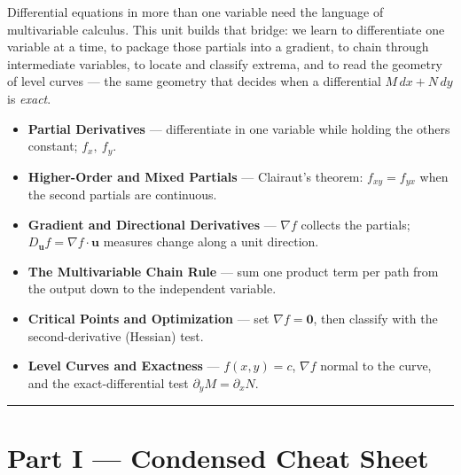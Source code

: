 \begin{topicsbox}
Differential equations in more than one variable need the language of
multivariable calculus. This unit builds that bridge: we learn to differentiate
one variable at a time, to package those partials into a gradient, to chain
through intermediate variables, to locate and classify extrema, and to read the
geometry of level curves --- the same geometry that decides when a differential
$M\,dx+N\,dy$ is \emph{exact}.
\begin{itemize}[leftmargin=1.4em, itemsep=3pt]
    \item \textbf{Partial Derivatives} --- differentiate in one variable while
          holding the others constant; $f_x,\ f_y$.
    \item \textbf{Higher-Order and Mixed Partials} --- Clairaut's theorem:
          $f_{xy}=f_{yx}$ when the second partials are continuous.
    \item \textbf{Gradient and Directional Derivatives} --- $\nabla f$ collects
          the partials; $D_{\mathbf u}f=\nabla f\cdot\mathbf u$ measures change
          along a unit direction.
    \item \textbf{The Multivariable Chain Rule} --- sum one product term per path
          from the output down to the independent variable.
    \item \textbf{Critical Points and Optimization} --- set $\nabla f=\mathbf 0$,
          then classify with the second-derivative (Hessian) test.
    \item \textbf{Level Curves and Exactness} --- $f(x,y)=c$, $\nabla f$ normal to
          the curve, and the exact-differential test $\partial_y M=\partial_x N$.
\end{itemize}
\end{topicsbox}

\vspace{0.6em}
\hrule
\vspace{0.6em}

{}
\section*{Part I --- Condensed Cheat Sheet}
\setcounter{section}{6}   %

